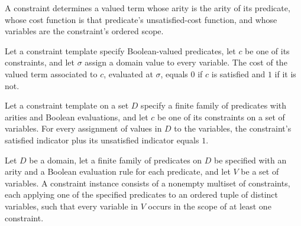 \begin{definition}
\label{FABL.CSPConstraint.toValuedTerm}
\leanok
{}
A constraint determines a valued term whose arity is the arity of its predicate, whose
cost function is that predicate’s unsatisfied-cost function, and whose variables are the
constraint’s ordered scope.
\end{definition}

\begin{theorem}
\label{FABL.CSPConstraint.evalSolution_toValuedTerm}
\leanok
{}
Let a constraint template specify Boolean-valued predicates, let $c$ be one of its
constraints, and let $\sigma$ assign a domain value to every variable. The cost of the
valued term associated to $c$, evaluated at $\sigma$, equals $0$ if $c$ is satisfied and
$1$ if it is not.
\end{theorem}

\begin{theorem}
\label{FABL.CSPConstraint.satisfiedIndicator_add_unsatisfiedIndicator}
\leanok
{}
Let a constraint template on a set $D$ specify a finite family of predicates with
arities and Boolean evaluations, and let $c$ be one of its constraints on a set of
variables. For every assignment of values in $D$ to the variables, the constraint’s
satisfied indicator plus its unsatisfied indicator equals $1$.
\end{theorem}

\begin{definition}
\label{FABL.CSPInstance}
\leanok
{}
Let $D$ be a domain, let a finite family of predicates on $D$ be specified with an arity
and a Boolean evaluation rule for each predicate, and let $V$ be a set of variables. A
constraint instance consists of a nonempty multiset of constraints, each applying one of
the specified predicates to an ordered tuple of distinct variables, such that every
variable in $V$ occurs in the scope of at least one constraint.
\end{definition}

